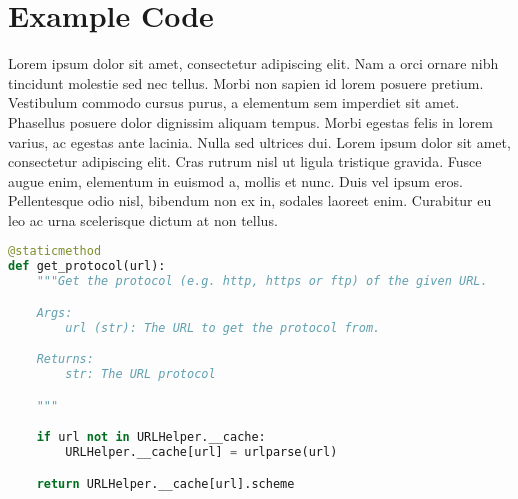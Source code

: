 \chapter{Example Code}

Lorem ipsum dolor sit amet, consectetur adipiscing elit. Nam a orci ornare nibh tincidunt molestie sed nec tellus. Morbi non sapien id lorem posuere pretium. Vestibulum commodo cursus purus, a elementum sem imperdiet sit amet. Phasellus posuere dolor dignissim aliquam tempus. Morbi egestas felis in lorem varius, ac egestas ante lacinia. Nulla sed ultrices dui. Lorem ipsum dolor sit amet, consectetur adipiscing elit. Cras rutrum nisl ut ligula tristique gravida. Fusce augue enim, elementum in euismod a, mollis et nunc. Duis vel ipsum eros. Pellentesque odio nisl, bibendum non ex in, sodales laoreet enim. Curabitur eu leo ac urna scelerisque dictum at non tellus.

\begin{lstlisting}[language=python]
@staticmethod
def get_protocol(url):
    """Get the protocol (e.g. http, https or ftp) of the given URL.

    Args:
        url (str): The URL to get the protocol from.

    Returns:
        str: The URL protocol

    """

    if url not in URLHelper.__cache:
        URLHelper.__cache[url] = urlparse(url)

    return URLHelper.__cache[url].scheme
\end{lstlisting}